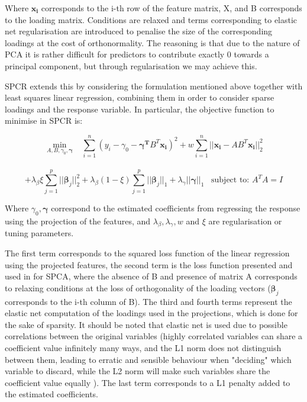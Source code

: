 \documentclass{article}
\begin{document}
\vspace{-1em}

Where $\boldsymbol{x_{i}}$ corresponds to the i-th row of the feature matrix, X, and B corresponds to the loading matrix. Conditions are relaxed and terms corresponding to elastic net regularisation are introduced to penalise the size of the corresponding loadings at the cost of orthonormality. The reasoning is that due to the nature of PCA it is rather difficult for predictors to contribute exactly 0 towards a principal component, but through regularisation we may achieve this.

SPCR extends this by considering the formulation mentioned above together with least squares linear regression, combining them in order to consider sparse loadings and the response variable. In particular, the objective function to minimise in SPCR is:

\vspace{-2.5em}

\begin{center}
    $$\displaystyle\min_{A,B, \gamma_{0}, \boldsymbol{\gamma}}\;\;\;\sum_{i=1}^{n}(y_{i}-\gamma_{0}-\boldsymbol{\gamma^{T}}B^{T}\boldsymbol{x_{i}})^{2} + w\sum_{i=1}^{n}||\boldsymbol{x_{i}} - AB^{T}\boldsymbol{x_{i}}||_{2}^{2}$$\\
    $$+ \lambda_{\beta}\xi\sum_{j=1}^{p}||\boldsymbol{\beta}_{j}||_{2}^{2} + \lambda_{\beta}(1-\xi)\sum_{j=1}^{p}||\boldsymbol{\beta}_{j}||_{1} + \lambda_{\gamma}||\boldsymbol{\gamma}||_{1}\;\;\;\text{subject to: $A^{T}A = I$}$$
\end{center}

Where $\gamma_{0}, \boldsymbol{\gamma}$ correspond to the estimated coefficients from regressing the response using the projection of the features, and $\lambda_{\beta}, \lambda_{\gamma}, w$ and $\xi$ are regularisation or tuning parameters. 

The first term corresponds to the squared loss function of the linear regression using the projected features, the second term is the loss function presented and used in \cite{SPCA} for SPCA, where the absence of B and presence of matrix A corresponds to relaxing conditions at the loss of orthogonality of the loading vectors ($\boldsymbol{\beta}_{j}$ corresponds to the i-th column of B). The third and fourth terms represent the elastic net computation of the loadings used in the projections, which is done for the sake of sparsity. It should be noted that elastic net is used due to possible correlations between the original variables (highly correlated variables can share a coefficient value infinitely many ways, and the L1 norm does not distinguish between them, leading to erratic and sensible behaviour when "deciding" which variable to discard, while the L2 norm will make such variables share the coefficient value equally \cite{SL_sparsity}). The last term corresponds to a L1 penalty added to the estimated coefficients. 
\end{document}
